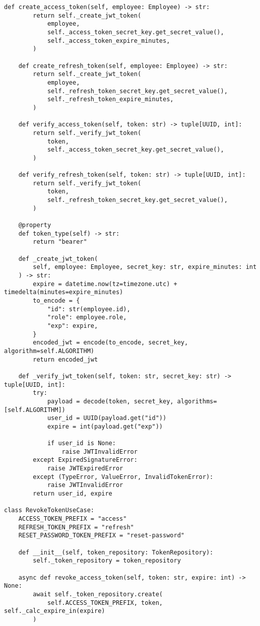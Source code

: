 \begin{lstlisting}[style=pythonstyle]
    def create_access_token(self, employee: Employee) -> str:
        return self._create_jwt_token(
            employee,
            self._access_token_secret_key.get_secret_value(),
            self._access_token_expire_minutes,
        )

    def create_refresh_token(self, employee: Employee) -> str:
        return self._create_jwt_token(
            employee,
            self._refresh_token_secret_key.get_secret_value(),
            self._refresh_token_expire_minutes,
        )

    def verify_access_token(self, token: str) -> tuple[UUID, int]:
        return self._verify_jwt_token(
            token,
            self._access_token_secret_key.get_secret_value(),
        )

    def verify_refresh_token(self, token: str) -> tuple[UUID, int]:
        return self._verify_jwt_token(
            token,
            self._refresh_token_secret_key.get_secret_value(),
        )

    @property
    def token_type(self) -> str:
        return "bearer"

    def _create_jwt_token(
        self, employee: Employee, secret_key: str, expire_minutes: int
    ) -> str:
        expire = datetime.now(tz=timezone.utc) + timedelta(minutes=expire_minutes)
        to_encode = {
            "id": str(employee.id),
            "role": employee.role,
            "exp": expire,
        }
        encoded_jwt = encode(to_encode, secret_key, algorithm=self.ALGORITHM)
        return encoded_jwt

    def _verify_jwt_token(self, token: str, secret_key: str) -> tuple[UUID, int]:
        try:
            payload = decode(token, secret_key, algorithms=[self.ALGORITHM])
            user_id = UUID(payload.get("id"))
            expire = int(payload.get("exp"))

            if user_id is None:
                raise JWTInvalidError
        except ExpiredSignatureError:
            raise JWTExpiredError
        except (TypeError, ValueError, InvalidTokenError):
            raise JWTInvalidError
        return user_id, expire

class RevokeTokenUseCase:
    ACCESS_TOKEN_PREFIX = "access"
    REFRESH_TOKEN_PREFIX = "refresh"
    RESET_PASSWORD_TOKEN_PREFIX = "reset-password"

    def __init__(self, token_repository: TokenRepository):
        self._token_repository = token_repository

    async def revoke_access_token(self, token: str, expire: int) -> None:
        await self._token_repository.create(
            self.ACCESS_TOKEN_PREFIX, token, self._calc_expire_in(expire)
        )


\end{lstlisting}
